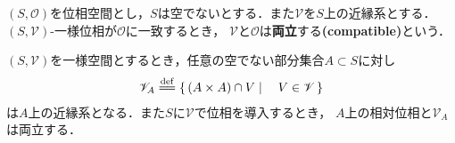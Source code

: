 	\begin{screen}
		\begin{dfn}[両立]
			$(S,\mathscr{O})$を位相空間とし，$S$は空でないとする．また$\mathscr{V}$を$S$上の近縁系とする．
			$(S,\mathscr{V})$-一様位相が$\mathscr{O}$に一致するとき，
			$\mathscr{V}$と$\mathscr{O}$は{\bf 両立}する{\bf (compatible)}という．
		\end{dfn}
	\end{screen}
	
	\begin{screen}
		\begin{thm}[部分一様空間]
			$(S,\mathscr{V})$を一様空間とするとき，任意の空でない部分集合$A \subset S$に対し
			\begin{align}
				\mathscr{V}_A \defeq 
				\Set{(A \times A) \cap V}{V \in \mathscr{V}}
			\end{align}
			は$A$上の近縁系となる．また$S$に$\mathscr{V}$で位相を導入するとき，
			$A$上の相対位相と$\mathscr{V}_A$は両立する．
		\end{thm}
	\end{screen}
	
